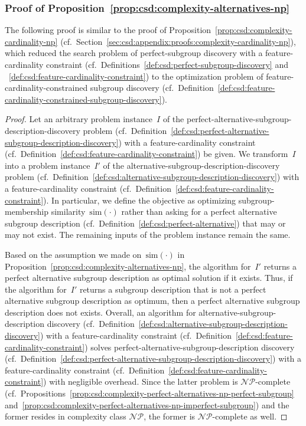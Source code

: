 \documentclass{article}
\theoremstyle{definition}
\begin{document}
\subsubsection{Proof of Proposition~\ref{prop:csd:complexity-alternatives-np}}
\label{sec:csd:appendix:proofs:complexity-alternatives-np}

The following proof is similar to the proof of Proposition~\ref{prop:csd:complexity-cardinality-np}
(cf.~Section~\ref{sec:csd:appendix:proofs:complexity-cardinality-np}), which reduced the search problem of perfect-subgroup discovery with a feature-cardinality constraint (cf.~Definitions~\ref{def:csd:perfect-subgroup-discovery} and ~\ref{def:csd:feature-cardinality-constraint}) to the optimization problem of feature-cardinality-constrained subgroup discovery (cf.~Definition~\ref{def:csd:feature-cardinality-constrained-subgroup-discovery}).
%
\begin{proof}
Let an arbitrary problem instance~$I$ of the perfect-alternative-subgroup-description-discovery problem (cf.~Definition~\ref{def:csd:perfect-alternative-subgroup-description-discovery}) with a feature-cardinality constraint (cf.~Definition~\ref{def:csd:feature-cardinality-constraint}) be given.
We transform~$I$ into a problem instance~$I'$ of the alternative-subgroup-description-discovery problem (cf.~Definition~\ref{def:csd:alternative-subgroup-description-discovery}) with a feature-cardinality constraint (cf.~Definition~\ref{def:csd:feature-cardinality-constraint}).
In particular, we define the objective as optimizing subgroup-membership similarity~$\text{sim}(\cdot)$ rather than asking for a perfect alternative subgroup description (cf.~Definition~\ref{def:csd:perfect-alternative}) that may or may not exist.
The remaining inputs of the problem instance remain the same.

Based on the assumption we made on~$\text{sim}(\cdot)$ in Proposition~\ref{prop:csd:complexity-alternatives-np}, the algorithm for~$I'$ returns a perfect alternative subgroup description as optimal solution if it exists.
Thus, if the algorithm for~$I'$ returns a subgroup description that is not a perfect alternative subgroup description as optimum, then a perfect alternative subgroup description does not exists.
Overall, an algorithm for alternative-subgroup-description discovery (cf.~Definition~\ref{def:csd:alternative-subgroup-description-discovery}) with a feature-cardinality constraint (cf.~Definition~\ref{def:csd:feature-cardinality-constraint}) solves perfect-alternative-subgroup-description discovery (cf.~Definition~\ref{def:csd:perfect-alternative-subgroup-description-discovery}) with a feature-cardinality constraint (cf.~Definition~\ref{def:csd:feature-cardinality-constraint}) with negligible overhead.
Since the latter problem is $\mathcal{NP}$-complete (cf.~Propositions~\ref{prop:csd:complexity-perfect-alternatives-np-perfect-subgroup} and~\ref{prop:csd:complexity-perfect-alternatives-np-imperfect-subgroup}) and the former resides in complexity class $\mathcal{NP}$, the former is $\mathcal{NP}$-complete as well.
\end{proof}

\renewcommand*{\bibfont}{\small} %
\printbibliography
\end{document}
